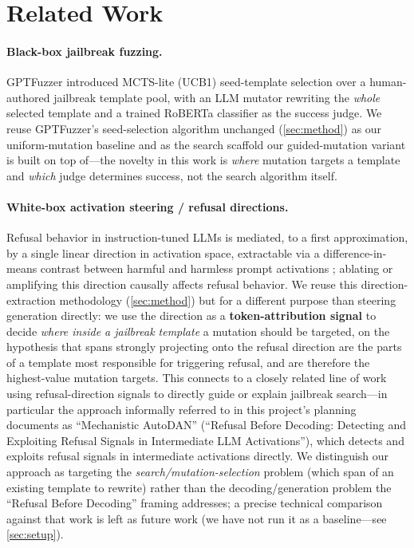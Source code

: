 \documentclass[11pt,letterpaper]{article}
\begin{document}
\section{Related Work}
\label{sec:related}

\paragraph{Black-box jailbreak fuzzing.}
GPTFuzzer \citep{yu2023gptfuzzer} introduced MCTS-lite (UCB1) seed-template selection over a
human-authored jailbreak template pool, with an LLM mutator rewriting the \textit{whole} selected
template and a trained RoBERTa classifier as the success judge. We reuse GPTFuzzer's
seed-selection algorithm unchanged (\cref{sec:method}) as our uniform-mutation baseline and as
the search scaffold our guided-mutation variant is built on top of---the novelty in this work is
\textit{where} mutation targets a template and \textit{which} judge determines success, not the
search algorithm itself.

\paragraph{White-box activation steering / refusal directions.}
Refusal behavior in instruction-tuned LLMs is mediated, to a first approximation, by a single
linear direction in activation space, extractable via a difference-in-means contrast between
harmful and harmless prompt activations \citep{arditi2024refusal}; ablating or amplifying this
direction causally affects refusal behavior. We reuse this direction-extraction methodology
(\cref{sec:method}) but for a different purpose than steering generation directly: we use the
direction as a \textbf{token-attribution signal} to decide \textit{where inside a jailbreak
template} a mutation should be targeted, on the hypothesis that spans strongly projecting onto
the refusal direction are the parts of a template most responsible for triggering refusal, and
are therefore the highest-value mutation targets. This connects to a closely related line of work
using refusal-direction signals to directly guide or explain jailbreak search---in particular the
approach informally referred to in this project's planning documents as ``Mechanistic AutoDAN''
\citep{collu2026refusal} (``Refusal Before Decoding: Detecting and Exploiting Refusal Signals in
Intermediate LLM Activations''), which detects and exploits refusal signals in intermediate
activations directly. We distinguish our approach as targeting the \textit{search/mutation-selection}
problem (which span of an existing template to rewrite) rather than the decoding/generation
problem the ``Refusal Before Decoding'' framing addresses; a precise technical comparison against
that work is left as future work (we have not run it as a baseline---see
\cref{sec:setup}).
\end{document}
